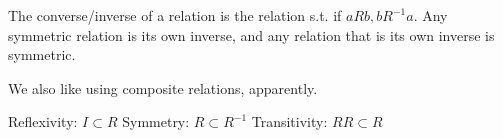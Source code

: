 \documentclass{article}
\newcommand{\nl}[0]{\newline}
\begin{document}
\begin{flushleft}

The converse/inverse of a relation is the relation s.t. if $a R b, b R^{-1} a$. Any symmetric relation is its own inverse, and any relation that is its own inverse is symmetric. \nl

We also like using composite relations, apparently. \nl

Reflexivity: $I \subset R$ \nl
Symmetry: $R \subset R^{-1}$ \nl
Transitivity: $RR \subset R$ \nl

\end{flushleft}
\end{document}
